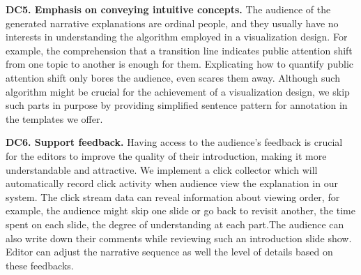 \documentclass[review,journal]{vgtc}         %
\begin{document}
\textbf{DC5. Emphasis on conveying intuitive concepts.} The audience of the generated narrative explanations are ordinal people, and they usually have no interests in understanding the algorithm employed in a visualization design. For example, the comprehension that a transition line indicates public attention shift from one topic to another is enough for them. Explicating how to quantify public attention shift only bores the audience, even scares them away. Although such algorithm might be crucial for the achievement of a visualization design, we skip such parts in purpose by providing simplified sentence pattern for annotation in the templates we offer. \par
\textbf{DC6. Support feedback.} Having access to the audience's feedback is crucial for the editors to improve  the quality of their introduction, making it more understandable and attractive.  We implement a click collector which will automatically record click activity when audience view the explanation in our system. The click stream data can reveal information about viewing order, for example, the audience might skip one slide or go back to revisit another, the time spent on each slide, the degree of understanding at each part.The audience can also write down their comments while reviewing such an introduction slide show. Editor can adjust the narrative sequence as well the level of details based on these feedbacks. 
\end{document}
